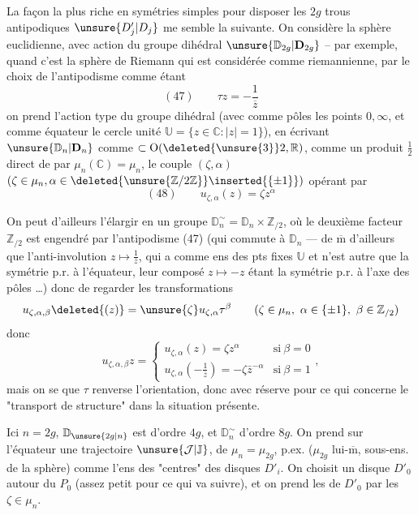 La façon la plus riche en symétries simples pour disposer les $2g$ trous antipodiques
$\unsure{D'_j|D_j}$ me semble la suivante. On  considère
la sphère euclidienne, avec action du groupe dihédral
$\unsure{\mathbb D_{2g}|\mathbf D_{2g}}$ -- par exemple, quand c'est la sphère de Riemann qui est
considérée comme riemannienne, par le choix de l'antipodisme comme étant
\[
(47)\qquad \tau z=-\frac{1}{\overline z}
\]
on prend l'action type du groupe dihédral (avec comme pôles les points $0,\infty$, et
comme équateur le cercle unité $\mathbb U=\{z\in\mathbb C\mathbin{:}|z|=1\}$),
 en écrivant
$\unsure{\mathbb D_n|\mathbf D_n}$ comme $\subset\operatorname O(\deleted{\unsure{3}}2,\mathbb R)$,
comme un produit $\frac12$ direct de
 par $\mu_n(\mathbb C)=\mu_n$,
le couple $(\zeta,\alpha)$ $(\zeta\in\mu_n,\alpha\in\deleted{\unsure{\mathbb Z/2\mathbb Z}}\inserted{\{\pm1\}})$ opérant par
\[
(48)\qquad u_{\zeta,\alpha}(z)=\zeta z^\alpha
\]


On peut d'ailleurs l'élargir en un groupe
$\mathbb D_n^\sim=\mathbb D_n\times\mathbb Z_{/2}$,
où le deuxième facteur $\mathbb Z_{/2}$ est engendré par l'antipodisme (47)
(qui commute à $\mathbb D_n$ --- de $\overline{\mathrm m}$ d'ailleurs
que l'anti-involution $z\longmapsto\frac{1}{\bar z}$, qui a comme
ens des pts fixes $\mathbb U$ et n'est autre que la symétrie p.r. à
l'équateur, leur composé $z\longmapsto-z$ étant la symétrie p.r. à
l'axe des pôles \ldots) donc de regarder les transformations
\[
u_{\zeta,\alpha,\beta}\deleted{(z)}=\unsure{\zeta}u_{\zeta,\alpha}\tau^\beta
\qquad
(\zeta\in\mu_n,\ \alpha\in\{\pm1\},\ \beta\in\mathbb Z_{/2})
\]
donc
\[
u_{\zeta,\alpha,\beta}z=
\begin{cases}
u_{\zeta,\alpha}(z)=\zeta z^\alpha&\mathrm{si}\ \beta=0\\
u_{\zeta,\alpha}(-\frac{1}{\bar z})=-\zeta\bar z^{-\alpha}
&\mathrm{si}\ \beta=1
\end{cases},
\]
mais on se  que $\tau$ renverse l'orientation,
donc 
 avec
réserve pour ce qui concerne le "transport de structure" dans
la situation présente.

Ici $n=2g$, $\mathbb D_{\unsure{2g|n}}$ est d'ordre $4g$, et
$\mathbb D_n^\sim$ d'ordre $8g$. On prend sur l'équateur une
trajectoire $\unsure{\mathcal J|\mathbb J}$, de $\mu_n=\mu_{2g}$, p.ex.
 
 ($\mu_{2g}$
lui-$\overline{\mathrm m}$, 
 sous-ens. de la sphère) comme l'ens des "centres"
des disques $D'_i$. On choisit un disque $D'_0$ autour du
 $P_0$ (assez petit pour ce qui va suivre), et on
prend les  de $D'_0$ par les
$\zeta\in\mu_n$.

